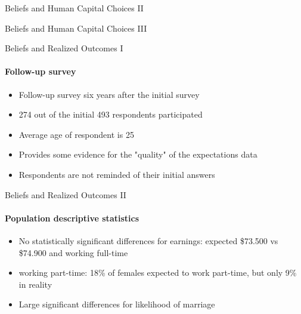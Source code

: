 \documentclass[12pt]{beamer}
\begin{document}
\begin{frame}{Beliefs and Human Capital Choices II}
     \begin{center}
    \end{center}
\end{frame}

\begin{frame}{Beliefs and Human Capital Choices III}
    \begin{center}
    \end{center}
\end{frame}


\begin{frame}{Beliefs and Realized Outcomes I}
    \framesubtitle{Follow-up survey}
    \begin{itemize}
        \item Follow-up survey six years after the initial survey
        \item 274 out of the initial 493 respondents participated
        \item Average age of respondent is 25
        \item Provides some evidence for the "quality" of the expectations data
        \item Respondents are not reminded of their initial answers
    \end{itemize}
    
\end{frame}

\begin{frame}{Beliefs and Realized Outcomes II}
    \framesubtitle{Population descriptive statistics}
    \begin{itemize}
        \item No statistically significant differences for earnings: expected \$73.500 vs \$74.900
         and working full-time
        \item working part-time: 18\% of females expected to work part-time, but only 9\% in reality
        \item Large significant differences for likelihood of marriage
    \end{itemize}
\end{frame}
\end{document}
